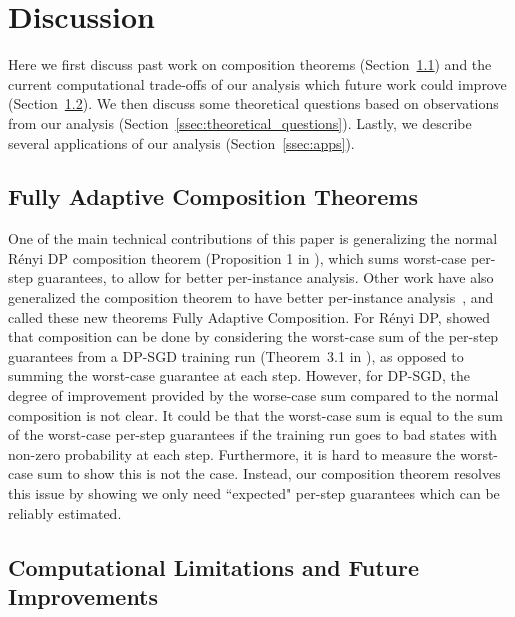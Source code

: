 \section{Discussion}


Here we first discuss past work on composition theorems (Section~\ref{ssec:back_full_comp}) and the current computational trade-offs of our analysis which future work could improve (Section~\ref{ssec:comp_lims}). We then discuss some theoretical questions based on observations from our analysis (Section~\ref{ssec:theoretical_questions}). Lastly, we describe several applications of our analysis (Section~\ref{ssec:apps}).

\subsection{Fully Adaptive Composition Theorems}
\label{ssec:back_full_comp}


One of the main technical contributions of this paper is generalizing the normal R\'enyi DP composition theorem (Proposition 1 in \citet{mironov2017renyi}), which sums worst-case per-step guarantees, to allow for better per-instance analysis. Other work have also generalized the composition theorem to have better per-instance analysis~\citep{feldman2021individual, koskela2022individual}, and called these new theorems Fully Adaptive Composition. For R\'enyi DP, \citet{feldman2021individual} showed that composition can be done by considering the worst-case sum of the per-step guarantees from a DP-SGD training run (Theorem~3.1 in \citet{feldman2021individual}), as opposed to summing the worst-case guarantee at each step. However, for DP-SGD, the degree of improvement provided by the worse-case sum compared to the normal composition is not clear. It could be that the worst-case sum is equal to the sum of the worst-case per-step guarantees if the training run goes to bad states with non-zero probability at each step. Furthermore, it is hard to measure the worst-case sum to show this is not the case. Instead, our composition theorem resolves this issue by showing we only need ``expected" per-step guarantees which can be reliably estimated.






\subsection{Computational Limitations and Future Improvements}
\label{ssec:comp_lims}





